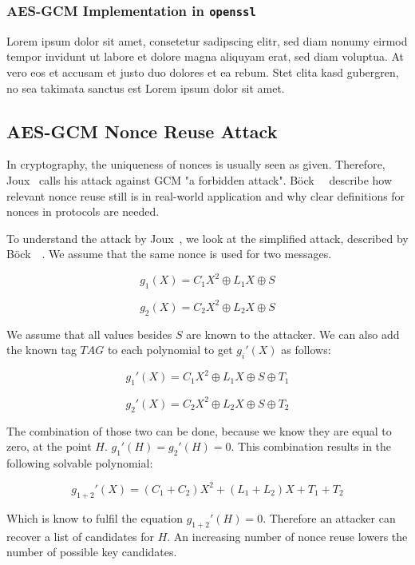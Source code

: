 \subsubsection{AES-GCM Implementation in \texttt{openssl}}

Lorem ipsum dolor sit amet, consetetur sadipscing elitr, sed diam nonumy eirmod
tempor invidunt ut labore et dolore magna aliquyam erat, sed diam voluptua. At
vero eos et accusam et justo duo dolores et ea rebum. Stet clita kasd gubergren,
no sea takimata sanctus est Lorem ipsum dolor sit amet.

\subsection{AES-GCM Nonce Reuse Attack}

In cryptography, the uniqueness of nonces is usually seen as given. Therefore,
Joux~\cite{NISTGCMcomment} calls his attack against GCM "a forbidden attack".
Böck~\etal~\cite{gcmnonceattack} describe how relevant nonce reuse still is in
real-world application and why clear definitions for nonces in protocols
are needed.

To understand the attack by Joux~\cite{NISTGCMcomment}, we look at the
simplified attack, described by Böck~\etal~\cite{gcmnonceattack}. We assume
that the same nonce is used for two messages.

\[
  g_1(X) = C{_{1}X^2 \oplus L_1X \oplus S}
\]

\[
  g_2(X) = C{_{2}X^2 \oplus L_2X \oplus S}
\]

We assume that all values besides $S$ are known to the attacker. We can also
add the known tag $TAG$ to each polynomial to get $g_i'(X)$ as follows:

\[
  g_1'(X) = C{_{1}X^2 \oplus L_1X \oplus S \oplus T_1}
\]

\[
  g_2'(X) = C{_{2}X^2 \oplus L_2X \oplus S \oplus T_2}
\]

The combination of those two can be done, because we know they are equal to
zero, at the point $H$. $g_1'(H) = g_2'(H) = 0$. This combination results in
the following solvable polynomial:

\[
  g_{1+2}'(X) = (C_{1} + C_{2})X^2 + (L_1 + L_2)X + T_1 + T_2
\]

Which is know to fulfil the equation $g_{1+2}'(H) = 0$. Therefore an attacker
can recover a list of candidates for $H$. An increasing number of nonce
reuse lowers the number of possible key candidates.



